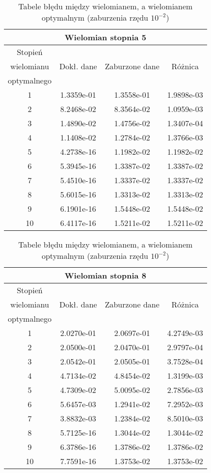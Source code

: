 \documentclass[a4paper]{article}
\theoremstyle{definition}
\theoremstyle{theorem}
\begin{document}
\begin{table}[!h]
  \begin{minipage}{.50\linewidth}
    \begin{tabular}{c|ccc}
      \multicolumn{4}{c}{Wielomian stopnia 5}\\
      \hline \hline
      Stopień &&\\
      wielomianu & Dokł. dane & Zaburzone dane & Różnica\\
      optymalnego &&\\
      \hline
1 & 1.3359e-01 & 1.3558e-01 & 1.9898e-03\\
2 & 8.2468e-02 & 8.3564e-02 & 1.0959e-03\\
3 & 1.4890e-02 & 1.4756e-02 & 1.3407e-04\\
4 & 1.1408e-02 & 1.2784e-02 & 1.3766e-03\\
5 & 4.2738e-16 & 1.1982e-02 & 1.1982e-02\\
6 & 5.3945e-16 & 1.3387e-02 & 1.3387e-02\\
7 & 5.4510e-16 & 1.3337e-02 & 1.3337e-02\\
8 & 5.6015e-16 & 1.3313e-02 & 1.3313e-02\\
9 & 6.1901e-16 & 1.5448e-02 & 1.5448e-02\\
10 & 6.4117e-16 & 1.5211e-02 & 1.5211e-02\\
\hline
    \end{tabular}
  \end{minipage}%
  \begin{minipage}{.50\linewidth}
    \begin{tabular}{c|ccc}
      \multicolumn{4}{c}{Wielomian stopnia 8}\\
      \hline \hline
      Stopień&&\\
      wielomianu & Dokł. dane & Zaburzone dane & Różnica\\
      optymalnego &&\\
      \hline
1 & 2.0270e-01 & 2.0697e-01 & 4.2749e-03\\
2 & 2.0500e-01 & 2.0470e-01 & 2.9797e-04\\
3 & 2.0542e-01 & 2.0505e-01 & 3.7528e-04\\
4 & 4.7134e-02 & 4.8454e-02 & 1.3199e-03\\
5 & 4.7309e-02 & 5.0095e-02 & 2.7856e-03\\
6 & 5.6457e-03 & 1.2941e-02 & 7.2952e-03\\
7 & 3.8832e-03 & 1.2384e-02 & 8.5010e-03\\
8 & 5.7125e-16 & 1.3044e-02 & 1.3044e-02\\
9 & 6.3786e-16 & 1.3786e-02 & 1.3786e-02\\
10 & 7.7591e-16 & 1.3753e-02 & 1.3753e-02\\
\hline
    \end{tabular}
  \end{minipage}
\caption{Tabele błędu między wielomianem, a wielomianem optymalnym (zaburzenia rzędu $10^{-2}$)}
\end{table}
\end{document}
